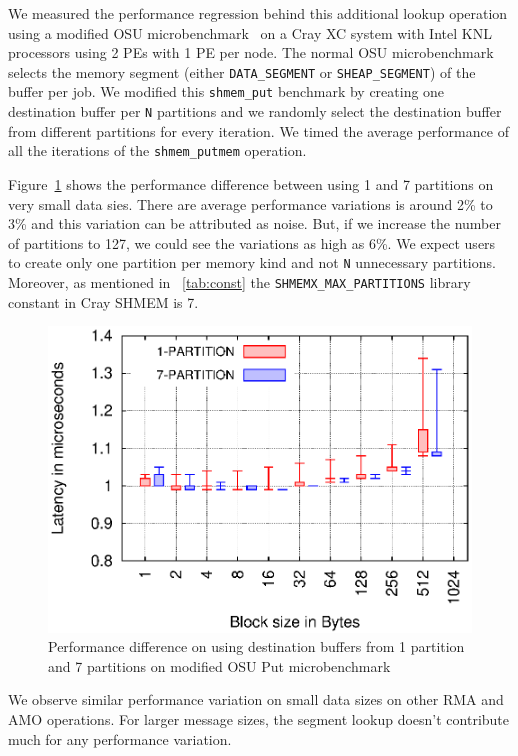 We measured the performance regression behind this additional lookup
operation using a modified OSU microbenchmark~\cite{pgas-benchmarks}
on a Cray XC system with Intel KNL processors using 2 PEs with 1 PE per
node.
The normal OSU microbenchmark selects the memory segment (either
\texttt{DATA\_SEGMENT} or \texttt{SHEAP\_SEGMENT}) of the buffer
per job. We modified this \texttt{shmem\_put} benchmark by creating
one destination buffer per \texttt{N} partitions and we randomly select
the destination buffer from different partitions for every iteration.
We timed the average performance of all the iterations of the
\texttt{shmem\_putmem} operation.

Figure~\ref{graph:lookup} shows the
performance difference between using 1 and 7 partitions on very small
data sies. There are average performance variations is around 2\% to
3\% and this variation can be attributed as noise. But, if we increase
the number of partitions to 127, we could see the variations as high as
6\%. We expect users to create only one partition per memory kind
and not \texttt{N} unnecessary partitions. Moreover, as mentioned in
~\ref{tab:const} the \texttt{SHMEMX\_MAX\_PARTITIONS} library constant
in Cray SHMEM is 7.

\begin{figure}[t!]
    \centering
    \includegraphics[width=\linewidth]{graph/osu-put.eps}
    \caption{Performance difference on using destination buffers
    from 1 partition and 7 partitions
    on modified OSU Put microbenchmark}
    \label{graph:lookup}
    \vspace{-20pt}
\end{figure}

We observe similar performance variation on small data sizes on other
RMA and AMO operations. For larger message sizes, the segment lookup
doesn't contribute much for any performance variation.